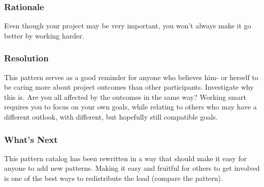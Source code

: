 \subsubsection*{Rationale} Even though your project may be very important, you
won't always make it go better by working harder.


\subsubsection*{Resolution}
This pattern serves as a good reminder for anyone who believes him- or
herself to be caring more about project outcomes than other
participants.
Investigate why this is.  Are you all affected by the
outcomes in the same way?
Working smart requires you to focus on your
own goals, while relating to others who may have a different outlook,
with different, but hopefully still compatible goals.

\subsubsection*{What's Next} This pattern catalog has been rewritten in a way
that should make it easy for anyone to add new patterns. Making it easy
and fruitful for others to get involved is one of the best ways to
redistribute the load (compare
the 
pattern).

\endgroup

    
    
    